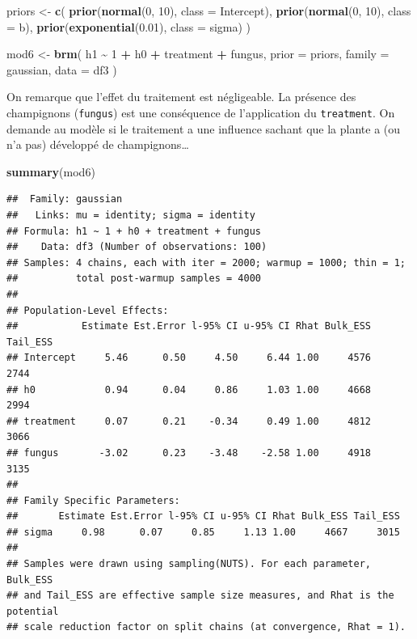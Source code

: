 \documentclass[
  a4paper,11pt,twoside,onecolumn,openright,final,oldfontcommands]{memoir}
\newenvironment{Shaded}{\begin{snugshade}}{\end{snugshade}}
\newcommand{\DataTypeTok}[1]{\textcolor[rgb]{0.13,0.29,0.53}{#1}}
\newcommand{\DecValTok}[1]{\textcolor[rgb]{0.00,0.00,0.81}{#1}}
\newcommand{\FloatTok}[1]{\textcolor[rgb]{0.00,0.00,0.81}{#1}}
\newcommand{\KeywordTok}[1]{\textcolor[rgb]{0.13,0.29,0.53}{\textbf{#1}}}
\newcommand{\NormalTok}[1]{#1}
\newcommand{\OperatorTok}[1]{\textcolor[rgb]{0.81,0.36,0.00}{\textbf{#1}}}
\newcommand{\StringTok}[1]{\textcolor[rgb]{0.31,0.60,0.02}{#1}}
\theoremstyle{definition}
\theoremstyle{definition}
\theoremstyle{definition}
\theoremstyle{remark}
\begin{document}
\begin{Shaded}
\begin{Highlighting}[]
\NormalTok{priors \textless{}{-}}\StringTok{ }\KeywordTok{c}\NormalTok{(}
  \KeywordTok{prior}\NormalTok{(}\KeywordTok{normal}\NormalTok{(}\DecValTok{0}\NormalTok{, }\DecValTok{10}\NormalTok{), }\DataTypeTok{class =}\NormalTok{ Intercept),}
  \KeywordTok{prior}\NormalTok{(}\KeywordTok{normal}\NormalTok{(}\DecValTok{0}\NormalTok{, }\DecValTok{10}\NormalTok{), }\DataTypeTok{class =}\NormalTok{ b),}
  \KeywordTok{prior}\NormalTok{(}\KeywordTok{exponential}\NormalTok{(}\FloatTok{0.01}\NormalTok{), }\DataTypeTok{class =}\NormalTok{ sigma)}
\NormalTok{  )}

\NormalTok{mod6 \textless{}{-}}\StringTok{ }\KeywordTok{brm}\NormalTok{(}
\NormalTok{  h1 }\OperatorTok{\textasciitilde{}}\StringTok{ }\DecValTok{1} \OperatorTok{+}\StringTok{ }\NormalTok{h0 }\OperatorTok{+}\StringTok{ }\NormalTok{treatment }\OperatorTok{+}\StringTok{ }\NormalTok{fungus,}
  \DataTypeTok{prior =}\NormalTok{ priors,}
  \DataTypeTok{family =}\NormalTok{ gaussian,}
  \DataTypeTok{data =}\NormalTok{ df3}
\NormalTok{  )}
\end{Highlighting}
\end{Shaded}

On remarque que l'effet du traitement est négligeable. La présence des champignons (\texttt{fungus}) est une conséquence de l'application du \texttt{treatment}. On demande au modèle si le traitement a une influence sachant que la plante a (ou n'a pas) développé de champignons\ldots{}

\begin{Shaded}
\begin{Highlighting}[]
\KeywordTok{summary}\NormalTok{(mod6)}
\end{Highlighting}
\end{Shaded}

\begin{verbatim}
##  Family: gaussian 
##   Links: mu = identity; sigma = identity 
## Formula: h1 ~ 1 + h0 + treatment + fungus 
##    Data: df3 (Number of observations: 100) 
## Samples: 4 chains, each with iter = 2000; warmup = 1000; thin = 1;
##          total post-warmup samples = 4000
## 
## Population-Level Effects: 
##           Estimate Est.Error l-95% CI u-95% CI Rhat Bulk_ESS Tail_ESS
## Intercept     5.46      0.50     4.50     6.44 1.00     4576     2744
## h0            0.94      0.04     0.86     1.03 1.00     4668     2994
## treatment     0.07      0.21    -0.34     0.49 1.00     4812     3066
## fungus       -3.02      0.23    -3.48    -2.58 1.00     4918     3135
## 
## Family Specific Parameters: 
##       Estimate Est.Error l-95% CI u-95% CI Rhat Bulk_ESS Tail_ESS
## sigma     0.98      0.07     0.85     1.13 1.00     4667     3015
## 
## Samples were drawn using sampling(NUTS). For each parameter, Bulk_ESS
## and Tail_ESS are effective sample size measures, and Rhat is the potential
## scale reduction factor on split chains (at convergence, Rhat = 1).
\end{verbatim}
\end{document}
